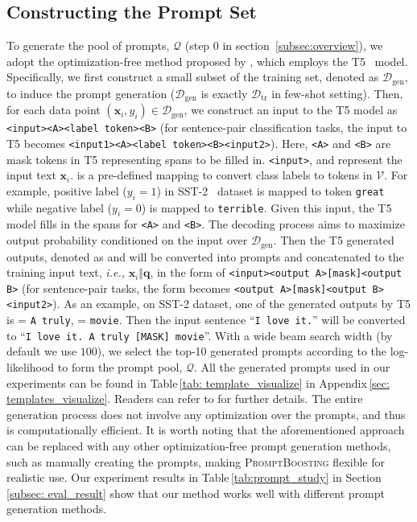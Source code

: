 \documentclass{article}
\theoremstyle{plain}
\theoremstyle{definition}
\theoremstyle{remark}
\newcommand{\alg}{\textsc{PromptBoosting}}
\begin{document}
\subsection{Constructing the Prompt Set}
\label{subsec:prompt_set}
To generate the pool of prompts, $\mathcal{Q}$ (step 0 in section~\ref{subsec:overview}), we adopt the optimization-free method proposed by \citet{gao2021making}, which employs the T5~\citep{raffel2020exploring} model. Specifically, we first construct a small subset of the training set, denoted as $\mathcal{D}_{\mathrm{gen}}$, to induce the prompt generation ($\mathcal{D}_{\mathrm{gen}}$ is exactly $\mathcal{D}_{\mathrm{tr}}$ in few-shot setting). Then, for each data point $(\bm x_{i},y_{i}) \in\mathcal{D}_{\mathrm{gen}}$, we construct an input to the T5 model as 
{\small\texttt{<input><A><label token><B>}}
(for sentence-pair classification tasks, the input to T5 becomes
{\small\texttt{<input1><A><label token><B><input2>}}).
Here, \texttt{\small <A>} and \texttt{\small<B>} are mask tokens in T5 representing spans to be filled in.  \texttt{\small<input>}, \texttt{} and \texttt{} represent the input text $\bm x_i$.
\texttt{} is a pre-defined mapping to convert class labels to tokens in $\mathcal{V}$. For example, positive label ($y_i = 1$) in SST-2~\citep{socher2013recursive} dataset is mapped to token \texttt{\small great} while negative label ($y_i = 0$) is mapped to \texttt{\small terrible}. Given this input, the T5 model fills in the spans for \texttt{\small<A>} and \texttt{\small<B>}. The decoding process aims to maximize output probability conditioned on the input over $\mathcal{D}_{\mathrm{gen}}$. 
Then the T5 generated outputs, denoted as \texttt{} and \texttt{} will be converted into prompts and concatenated to the training input text, \emph{i.e.,} $\bm x_{i} \Vert \bm q$, in the form of 
\texttt{\small<input><output A>[mask]<output B>}
(for sentence-pair tasks, the form becomes \texttt{<output A>[mask]<output B><input2>}).
As an example, on SST-2 dataset, one of the generated outputs by T5 is \texttt{} = \texttt{\small A truly}, \texttt{} = \texttt{\small movie}. Then the input sentence ``\texttt{\small I love it.}'' will be converted to ``\texttt{\small I love it. A truly [MASK] movie}''.
With a wide beam search width (by default we use $100$), we select the top-10 generated prompts according to the log-likelihood to form the prompt pool, $\mathcal{Q}$. All the generated prompts used in our experiments can be found in Table\,\ref{tab: template_visualize} in Appendix\,\ref{sec: templates_visualize}. Readers can refer to \citet{gao2021making} for further details. The entire generation process does not involve any optimization over the prompts, and thus is computationally efficient. 
It is worth noting that the aforementioned approach can be replaced with any other optimization-free prompt generation methods, such as manually creating the prompts, making {\alg} flexible for realistic use. 
Our experiment results in Table\,\ref{tab:prompt_study} in Section\,\ref{subsec: eval_result} show that our method works well with different prompt generation methods.
\end{document}
